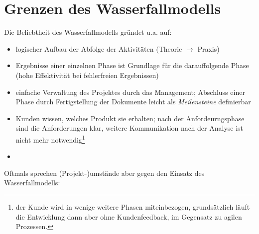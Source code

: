 \section{Grenzen des Wasserfallmodells}\label{sec:grenzen-des-wasserfallmodells}

\noindent
Die Beliebtheit des Wasserfallmodells gründet u.a. auf:

\begin{itemize}
    \item logischer Aufbau der Abfolge der Aktivitäten (Theorie $\rightarrow$ Praxis)
    \item Ergebnisse einer einzelnen Phase ist Grundlage für die darauffolgende Phase (hohe Effektivität bei fehlerfreien Ergebnissen)
    \item einfache Verwaltung des Projektes durch das Management; Abschluss einer Phase durch Fertigstellung der Dokumente leicht als \textit{Meilensteine} definierbar
    \item Kunden wissen, welches Produkt sie erhalten; nach der Anfordeurngsphase sind die Anforderungen klar, weitere Kommunikation nach der Analyse ist nicht mehr notwendig\footnote{
    der Kunde wird in wenige weitere Phasen miteinbezogen, grundsätzlich läuft die Entwicklung dann aber ohne Kundenfeedback, im Gegensatz zu agilen Prozessen.
    }
    \item
\end{itemize}

\noindent
Oftmals sprechen (Projekt-)umstände aber gegen den Einsatz des Wasserfallmodells:

